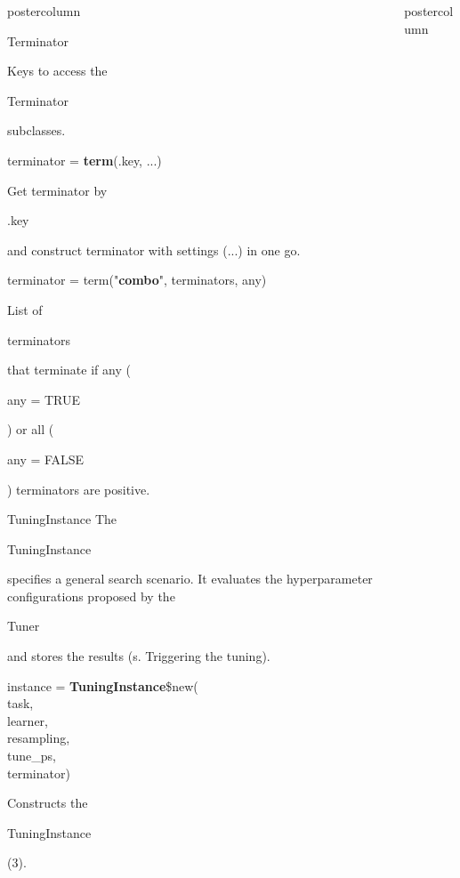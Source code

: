 \documentclass{beamer}
\newcommand{\codeinline}[1]{\begin{codeboxinline}#1\end{codeboxinline}}
\begin{document}
\begin{frame}[fragile]{}
\begin{columns}
\begin{column}{.245\textwidth}
\begin{beamercolorbox}[center]{postercolumn}
\begin{minipage}{.98\textwidth}
{\begin{myblock}{Terminator}
\begin{itemize}
							\end{itemize}
							\vspace{0.5cm}
							Keys to access the \codeinline{Terminator} subclasses.
							\\
							\begin{codebox}
								terminator = \textbf{term}(.key, ...)
							\end{codebox}
							Get terminator by \codeinline{.key} and construct terminator with settings (...) in one go.
							\\
							\begin{codebox}
								terminator = term("\textbf{combo}", terminators, any)
							\end{codebox}
							List of \codeinline{terminators} that terminate if any (\codeinline{any = TRUE}) or all (\codeinline{any = FALSE}) terminators are positive.
						\end{myblock}
						\begin{myblock}{TuningInstance}
							The \codeinline{TuningInstance} specifies a general search scenario. It evaluates the hyperparameter configurations proposed by the \codeinline{Tuner} and stores the results (s. Triggering the tuning).
							\\
							\begin{codeboxmultiline}[width=20cm]
								instance = \textbf{TuningInstance}\$new(\\
								\hspace*{1ex}task,\\
								\hspace*{1ex}learner,\\
								\hspace*{1ex}resampling,\\
								\hspace*{1ex}tune\_ps,\\
								\hspace*{1ex}terminator)
							\end{codeboxmultiline}
							Constructs the \codeinline{TuningInstance} (3).
							\\
						\end{myblock}
						\vfill}
				\end{minipage}
			\end{beamercolorbox}
		\end{column}
		\begin{column}{.245\textwidth}
			\begin{beamercolorbox}[center]{postercolumn}
				\begin{minipage}{.98\textwidth}

\end{minipage}
\end{beamercolorbox}
\end{column}
\end{columns}
\end{frame}
\end{document}
